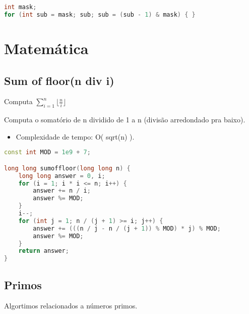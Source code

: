 \documentclass[11pt, a4paper, oneside]{book}
\begin{document}
\begin{multicols}{2}
\begin{lstlisting}[language=C++]
int mask;
for (int sub = mask; sub; sub = (sub - 1) & mask) { }
\end{lstlisting}
\end{multicols}

\hfill

\newpage

%
%
%
%

\chapter{Matemática}

\section{Sum of floor(n div i)}


Computa $\sum_{i=1}^{n} \lfloor\frac{n}{i}\rfloor $



Computa o somatório de n dividido de 1 a n (divisão arredondado pra baixo).



\begin{itemize}
\item Complexidade de tempo: O( sqrt(n) ).
\end{itemize}

\hfill

\begin{multicols}{2}
\begin{lstlisting}[language=C++]
const int MOD = 1e9 + 7;

long long sumoffloor(long long n) {
    long long answer = 0, i;
    for (i = 1; i * i <= n; i++) {
        answer += n / i;
        answer %= MOD;
    }
    i--;
    for (int j = 1; n / (j + 1) >= i; j++) {
        answer += (((n / j - n / (j + 1)) % MOD) * j) % MOD;
        answer %= MOD;
    }
    return answer;
}
\end{lstlisting}
\end{multicols}

\hfill

\section{Primos}


Algortimos relacionados a números primos.
\end{document}
